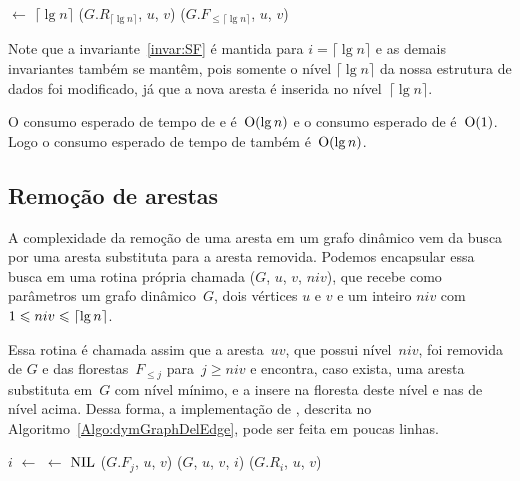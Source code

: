\begin{algorithm}
\caption{\dymGraphAddEdge($G$, $u$, $v$)}
\label{Algo:dymGraphAddEdge}
\begin{algorithmic}[1]
\State \nivel[$u$,$v$] $\gets$ $\lceil \lg n \rceil$
\State \graphAdd($G$.$R_{\lceil \lg n \rceil}$, $u$, $v$)
\Else 
\State \dymForestAddEdge($G.F_{\leqslant\lceil \lg n \rceil}$, $u$, $v$)
\EndIf
\end{algorithmic}
\end{algorithm}

Note que a invariante~\ref{invar:SF} é mantida para $i = \lceil \lg n \rceil$ e as demais invariantes também se mantêm, pois somente o nível $\lceil \lg n \rceil$ da nossa estrutura de dados foi modificado, já que a nova aresta é inserida no nível~$\lceil \lg n \rceil$. 

O consumo esperado de tempo de \dymForestQuery{} e \dymForestAddEdge{} é~$\mathrm{O}(\lg n)$ e o consumo esperado de \graphAdd{} é~$\mathrm{O}(1)$.
Logo o consumo esperado de tempo de \dymGraphAddEdge{} também é~$\mathrm{O}(\lg n)$.

\subsection{Remoção de arestas}

A complexidade da remoção de uma aresta em um grafo dinâmico vem da busca por uma aresta substituta para a aresta removida.
Podemos encapsular essa busca em uma rotina própria chamada \dymGraphReplace($G$, $u$, $v$, $niv$),
que recebe como parâmetros um grafo dinâmico~$G$, dois vértices $u$ e $v$ e um inteiro $niv$ com $1 \leqslant niv \leqslant \lceil{\lg n}\rceil$.

Essa rotina é chamada assim que a aresta~$uv$, que possui nível~$niv$, foi removida de $G$ e das florestas~$F_{\leqslant j}$ para~$j \geq niv$ e 
encontra, caso exista, uma aresta substituta em~$G$ com nível mínimo, e a insere na floresta deste nível e nas de nível acima.
Dessa forma, a implementação de \dymGraphDelEdge{}, descrita no Algoritmo~\ref{Algo:dymGraphDelEdge}, pode ser feita em poucas linhas.

\begin{algorithm}
\caption{\dymGraphDelEdge($G$, $u$, $v$)}
\label{Algo:dymGraphDelEdge}
\begin{algorithmic}[1]
\State $i$ $\gets$ \nivel[$u,v$]
\State \nivel[$u,v$] $\gets$ $\text{NIL}$
\label{Algo:dymGraphDelEdge:linha:if}
\label{linha2}
\State \dymForestDelEdge($G$.$F_j$, $u$, $v$)
\EndFor
\State \dymGraphReplace($G$, $u$, $v$, $i$)
\Else
  \State \graphDel($G$.$R_i$, $u$, $v$)\label{Algo:dymGraphDelEdge:linha:removeLA}
\EndIf
\end{algorithmic}
\end{algorithm}

